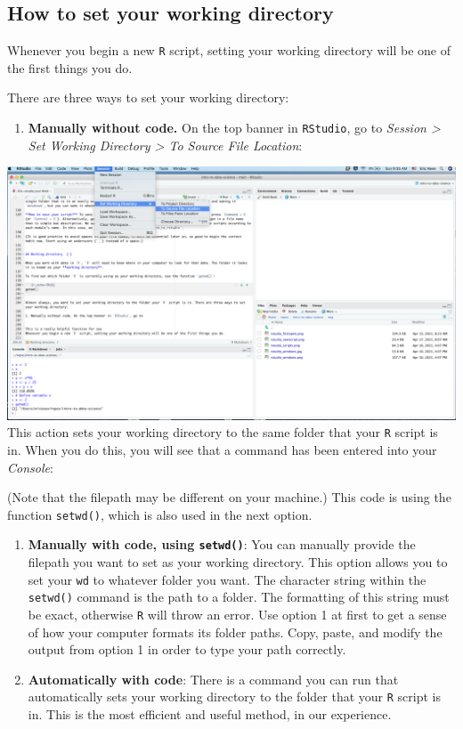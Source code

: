 \documentclass[
]{book}
\providecommand{\tightlist}{%
  \setlength{\itemsep}{0pt}\setlength{\parskip}{0pt}}
\begin{document}
\hypertarget{how-to-set-your-working-directory}{%
\subsection*{How to set your working directory}\label{how-to-set-your-working-directory}}

Whenever you begin a new \texttt{R} script, setting your working directory will be one of the first things you do.

There are three ways to set your working directory:

\begin{enumerate}
\def\labelenumi{\arabic{enumi}.}
\tightlist
\item
  \textbf{Manually without code.} On the top banner in \texttt{RStudio}, go to \emph{Session \textgreater{} Set Working Directory \textgreater{} To Source File Location}:
\end{enumerate}

\includegraphics{img/rstudio_setwd.png}
This action sets your working directory to the same folder that your \texttt{R} script is in. When you do this, you will see that a command has been entered into your \emph{Console}:

(Note that the filepath may be different on your machine.) This code is using the function \texttt{setwd()}, which is also used in the next option.

\begin{enumerate}
\def\labelenumi{\arabic{enumi}.}
\setcounter{enumi}{1}
\item
  \textbf{Manually with code, using \texttt{setwd()}}: You can manually provide the filepath you want to set as your working directory. This option allows you to set your \texttt{wd} to whatever folder you want. The character string within the \texttt{setwd()} command is the path to a folder. The formatting of this string must be exact, otherwise \texttt{R} will throw an error. Use option 1 at first to get a sense of how your computer formats its folder paths. Copy, paste, and modify the output from option 1 in order to type your path correctly.
\item
  \textbf{Automatically with code}: There is a command you can run that automatically sets your working directory to the folder that your \texttt{R} script is in. This is the most efficient and useful method, in our experience.
\end{enumerate}
\end{document}
